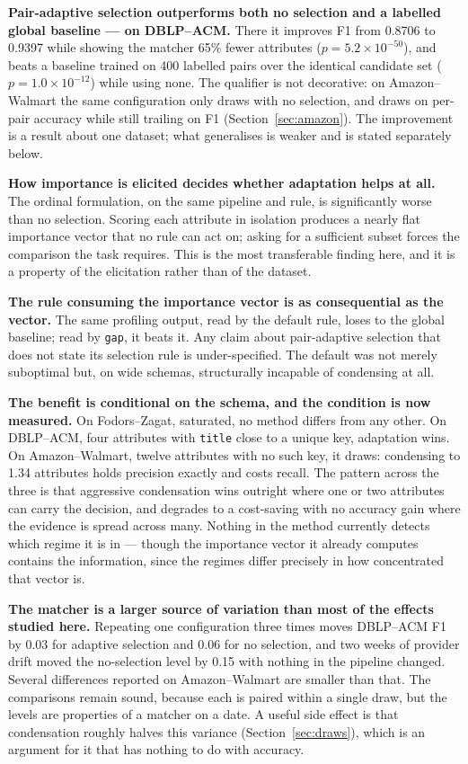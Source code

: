 \documentclass[11pt]{article}
\begin{document}
\textbf{Pair-adaptive selection outperforms both no selection and a labelled global
baseline --- on DBLP--ACM.} There it improves F1 from 0.8706 to 0.9397 while showing the
matcher 65\% fewer attributes ($p = 5.2\times10^{-50}$), and beats a baseline trained on 400
labelled pairs over the identical candidate set ($p = 1.0\times10^{-12}$) while using none.
The qualifier is not decorative: on Amazon--Walmart the same configuration only draws with
no selection, and draws on per-pair accuracy while still trailing on F1
(Section~\ref{sec:amazon}). The improvement is a result about one dataset; what generalises
is weaker and is stated separately below.

\textbf{How importance is elicited decides whether adaptation helps at all.} The ordinal
formulation, on the same pipeline and rule, is significantly worse than no selection.
Scoring each attribute in isolation produces a nearly flat importance vector that no rule
can act on; asking for a sufficient subset forces the comparison the task requires. This is
the most transferable finding here, and it is a property of the elicitation rather than of
the dataset.

\textbf{The rule consuming the importance vector is as consequential as the vector.} The
same profiling output, read by the default rule, loses to the global baseline; read by
\texttt{gap}, it beats it. Any claim about pair-adaptive selection that does not state its
selection rule is under-specified. The default was not merely suboptimal but, on wide
schemas, structurally incapable of condensing at all.

\textbf{The benefit is conditional on the schema, and the condition is now measured.} On
Fodors--Zagat, saturated, no method differs from any other. On DBLP--ACM, four attributes
with \texttt{title} close to a unique key, adaptation wins. On Amazon--Walmart, twelve
attributes with no such key, it draws: condensing to 1.34 attributes holds precision exactly
and costs recall. The pattern across the three is that aggressive condensation wins outright
where one or two attributes can carry the decision, and degrades to a cost-saving with no
accuracy gain where the evidence is spread across many. Nothing in the method currently
detects which regime it is in --- though the importance vector it already computes contains
the information, since the regimes differ precisely in how concentrated that vector is.

\textbf{The matcher is a larger source of variation than most of the effects studied here.}
Repeating one configuration three times moves DBLP--ACM F1 by 0.03 for adaptive selection and
0.06 for no selection, and two weeks of provider drift moved the no-selection level by 0.15
with nothing in the pipeline changed. Several differences reported on Amazon--Walmart are
smaller than that. The comparisons remain sound, because each is paired within a single draw,
but the levels are properties of a matcher on a date. A useful side effect is that
condensation roughly halves this variance (Section~\ref{sec:draws}), which is an argument for
it that has nothing to do with accuracy.
\end{document}
